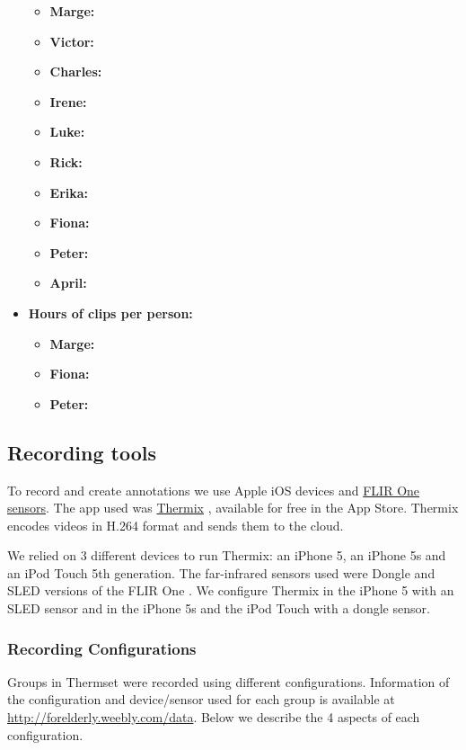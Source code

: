 \documentclass[oneside, twocolumn]{article}
\begin{document}
\begin{itemize}
\begin{itemize}
    \item \textbf{Marge: \MargeDays{}}
    \item \textbf{Victor: \VictorDays{}}
    \item \textbf{Charles: \CharlesDays{}}
    \item \textbf{Irene: \IreneDays{}}
    \item \textbf{Luke: \LukeDays{}}
    \item \textbf{Rick: \RickDays{}}
    \item \textbf{Erika: \ErikaDays{}}
    \item \textbf{Fiona: \FionaDays{}}
    \item \textbf{Peter: \PeterDays{}}
    \item \textbf{April: \AprilDays{}}
    \fi
  \end{itemize}
  \item \textbf{Hours of clips per person:}
  \begin{itemize}
    \item \textbf{Marge: \MargeHours{}}
    \item \textbf{Fiona: \FionaHours{}}
    \item \textbf{Peter: \PeterHours{}}
  \end{itemize}
\end{itemize}

\subsection{Recording tools}
To record and create annotations we use Apple iOS devices and \href{http://www.flir.com/flirone/ios/}{FLIR One sensors}.
The app used was \href{http://appstore.com/thermixforflirone}{Thermix}\cite{thermix} ,
available for free in the App Store. Thermix encodes videos in H.264 format and sends them to the cloud.

We relied on 3 different devices to run Thermix: an iPhone 5, an iPhone 5s and an iPod Touch 5th generation.
The far-infrared sensors used were Dongle and SLED versions of the FLIR One \cite{sdk_flir_dongle}\cite{sdk_flir_sled}.
We configure Thermix in the iPhone 5 with an SLED sensor and in the iPhone 5s and the
iPod Touch with a dongle sensor.

\subsubsection{Recording Configurations}
Groups in Thermset were recorded using different configurations. Information of the configuration and device/sensor used
for each group is available at \url{http://forelderly.weebly.com/data}. Below we describe the 4 aspects of each
configuration.
\end{document}
